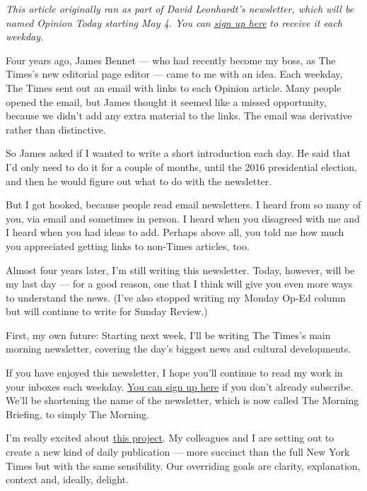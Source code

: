 \emph{This article originally ran as part of David Leonhardt's
newsletter, which will be named Opinion Today starting May 4. You can}
\href{https://www.nytimes3xbfgragh.onion/newsletters/opinion-todaynl}{\emph{sign
up here}} \emph{to receive it each weekday.}

Four years ago, James Bennet --- who had recently become my boss, as The
Times's new editorial page editor --- came to me with an idea. Each
weekday, The Times sent out an email with links to each Opinion article.
Many people opened the email, but James thought it seemed like a missed
opportunity, because we didn't add any extra material to the links. The
email was derivative rather than distinctive.

So James asked if I wanted to write a short introduction each day. He
said that I'd only need to do it for a couple of months, until the 2016
presidential election, and then he would figure out what to do with the
newsletter.

But I got hooked, because people read email newsletters. I heard from so
many of you, via email and sometimes in person. I heard when you
disagreed with me and I heard when you had ideas to add. Perhaps above
all, you told me how much you appreciated getting links to non-Times
articles, too.

Almost four years later, I'm still writing this newsletter. Today,
however, will be my last day --- for a good reason, one that I think
will give you even more ways to understand the news. (I've also stopped
writing my Monday Op-Ed column but will continue to write for Sunday
Review.)

First, my own future: Starting next week, I'll be writing The Times's
main morning newsletter, covering the day's biggest news and cultural
developments.

If you have enjoyed this newsletter, I hope you'll continue to read my
work in your inboxes each weekday.
\href{https://www.nytimes3xbfgragh.onion/newsletters/morning-briefing}{You
can sign up here} if you don't already subscribe. We'll be shortening
the name of the newsletter, which is now called The Morning Briefing, to
simply The Morning.

I'm really excited about
\href{https://www.nytco.com/press/new-role-for-david-leonhardt/}{this
project}. My colleagues and I are setting out to create a new kind of
daily publication --- more succinct than the full New York Times but
with the same sensibility. Our overriding goals are clarity,
explanation, context and, ideally, delight.

